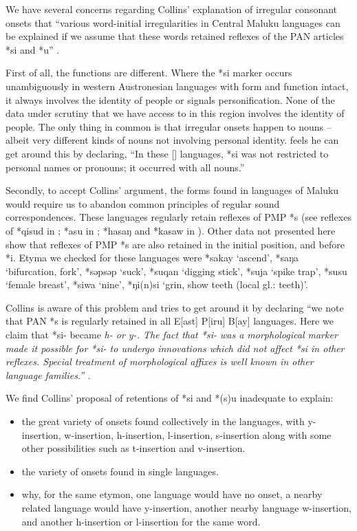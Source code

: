 We have several concerns regarding Collins’ explanation of irregular
consonant onsets that “various word-initial irregularities in
Central Maluku languages can be explained if we assume that these
words retained reflexes of the PAN articles *si and *u” \citep[6]{Collins1983}.

First of all, the functions are different.
Where the *si marker occurs unambiguously in western Austronesian
languages with form and function intact, it always involves the identity of people or signals personification.
None of the data under scrutiny that we have access to in this
region involves the identity of people.
The only thing in common is that irregular onsets happen to nouns -- albeit
very different kinds of nouns not involving personal identity.
\citet[124]{Collins1983} feels he can get around this by declaring,
“In these [] languages,
*si was not restricted to personal names or pronouns; it occurred
with all nouns.” 

Secondly, to accept Collins’ argument,
the forms found in languages of Maluku would require us to abandon
common principles of regular sound correspondences.
These languages regularly retain reflexes of PMP *s (see reflexes
of *qisud in ; *asu in ; *hasaŋ
and *kasaw in ).
Other data not presented here show that reflexes of PMP *s are
also retained in the initial position, and before *i.
Etyma we checked for these languages were *sakay ‘ascend’,
*saŋa ‘bifurcation, fork’, *səpsəp ‘suck’, *suqan ‘digging stick’,
*suja ‘spike trap’, *susu ‘female breast’, *siwa ‘nine’,
*ŋi(n)si ‘grin, show teeth (local gl.: teeth)’.

Collins is aware of this problem
and tries to get around it by declaring “we note that PAN *s
is regularly retained in all E[ast] P[iru] B[ay] languages.
Here we claim that *si- became \it{h-} or \it{y-}.
The fact that *si- was a morphological marker made it possible
for *si- to undergo innovations which did not affect *si in other reflexes.
Special treatment of morphological affixes is
well known in other language families.” \citep[124f]{Collins1983}.

We find Collins’ proposal of retentions of *si
and *(s)u inadequate to explain:

\begin{itemize}
	\item	the great variety of onsets found collectively in the languages,
				with y-insertion, w-insertion, h-insertion, l-insertion, s-insertion
				along with some other possibilities such as t-insertion and v-insertion.
	\item	the variety of onsets found in single languages.
	\item	why, for the same etymon,
				one language would have no onset,
				a nearby related language would have y-insertion,
				another nearby language w-insertion,
				and another h-insertion or l-insertion for the same word.
\end{itemize}

